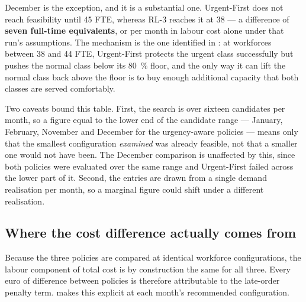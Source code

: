 December is the exception, and it is a substantial one. Urgent-First does not reach feasibility
until 45 FTE, whereas RL-3 reaches it at 38 --- a difference of \textbf{seven full-time
equivalents}, or  per month in labour cost alone under that run's assumptions. The
mechanism is the one identified in : at workforces between 38 and 44 FTE,
Urgent-First protects the urgent class successfully but pushes the normal class below its
\SI{80}{\percent} floor, and the only way it can lift the normal class back above the floor is
to buy enough additional capacity that both classes are served comfortably.

Two caveats bound this table. First, the search is over sixteen candidates per month, so a
figure equal to the lower end of the candidate range --- January, February, November and
December for the urgency-aware policies --- means only that the smallest configuration
\emph{examined} was already feasible, not that a smaller one would not have been. The December
comparison is unaffected by this, since both policies were evaluated over the same range and
Urgent-First failed across the lower part of it. Second, the entries are drawn from a single
demand realisation per month, so a marginal figure could shift under a different realisation.

\subsection{Where the cost difference actually comes from}
\label{sec:res-cost-decomposition}

Because the three policies are compared at identical workforce configurations, the labour
component of total cost is by construction the same for all three. Every euro of difference
between policies is therefore attributable to the late-order penalty term.
 makes this explicit at each month's recommended configuration.

